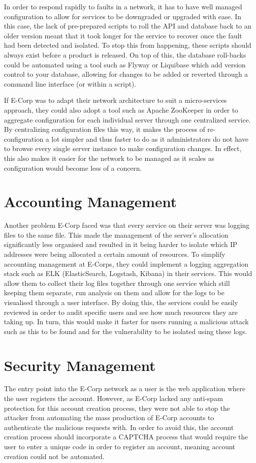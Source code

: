 \documentclass[]{report}
\begin{document}
In order to respond rapidly to faults in a network, it has to have well managed configuration to allow for services to be downgraded or upgraded with ease. In this case, the lack of pre-prepared scripts to roll the API and database back to an older version meant that it took longer for the service to recover once the fault had been detected and isolated. To stop this from happening, these scripts should always exist before a product is released. On top of this, the database roll-backs could be automated using a tool such as Flyway or Liquibase which add version control to your database, allowing for changes to be added or reverted through a command line interface (or within a script).

If E-Corp was to adapt their network architecture to suit a micro-services approach, they could also adopt a tool such as Apache ZooKeeper in order to aggregate configuration for each individual server through one centralized service. By centralizing configuration files this way, it makes the process of re-configuration a lot simpler and thus faster to do as it administrators do not have to browse every single server instance to make configuration changes. In effect, this also makes it easier for the network to be managed as it scales as configuration would become less of a concern. 

\section*{Accounting Management}
Another problem E-Corp faced was that every service on their server was logging files to the same file. This made the management of the server's allocation significantly less organised and resulted in it being harder to isolate which IP addresses were being allocated a certain amount of resources. To simplify accounting management at E-Corps, they could implement a logging aggregation stack such as ELK (ElasticSearch, Logstash, Kibana) in their services. This would allow them to collect their log files together through one service which still keeping them separate, run analysis on them and allow for the logs to be visualised through a user interface. By doing this, the services could be easily reviewed in order to audit specific users and see how much resources they are taking up. In turn, this would make it faster for users running a malicious attack such as this to be found and for the vulnerability to be isolated using these logs.

\section*{Security Management}
The entry point into the E-Corp network as a user is the web application where the user registers the account. However, as E-Corp lacked any anti-spam protection for this account creation process, they were not able to stop the attacker from automating the mass production of E-Corp accounts to authenticate the malicious requests with. In order to avoid this, the account creation process should incorporate a CAPTCHA process that would require the user to enter a unique code in order to register an account, meaning account creation could not be automated.
\end{document}
